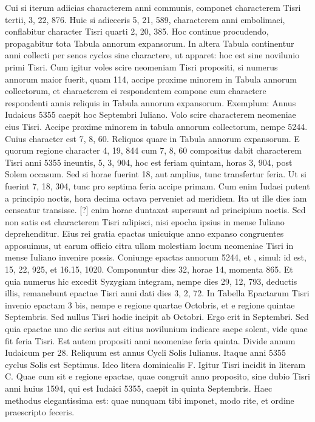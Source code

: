 Cui si iterum adiicias characterem anni communis, componet
characterem Tisri tertii, 3, 22, 876.
Huic si adieceris 5, 21, 589,
characterem anni embolimaei, conflabitur character Tisri quarti
2, 20, 385.
Hoc continue procudendo, propagabitur tota Tabula
annorum expansorum.
In altera Tabula continentur anni collecti
per senos cyclos sine charactere, ut apparet: hoc est sine novilunio
primi Tisri.
Cum igitur voles scire neomeniam Tisri propositi,
si numerus annorum maior fuerit, quam 114, accipe proxime
minorem in Tabula annorum collectorum, et characterem ei
respondentem compone cum charactere respondenti annis reliquis
in Tabula annorum expansorum.
Exemplum: Annus Iudaicus
5355 caepit hoc Septembri Iuliano.
Volo scire characterem
neomeniae eius Tisri.
Accipe proxime minorem in tabula annorum
collectorum, nempe 5244.
Cuius character est 7, 8, 60.
Reliquos  quare in Tabula annorum expansorum.
E quorum
regione character 4, 19, 844 cum 7, 8, 60 compositus dabit characterem
Tisri anni 5355 ineuntis, 5, 3, 904, hoc est feriam quintam,
horas 3, 904, post Solem occasum.
Sed si horae fuerint 18, aut
amplius, tunc transfertur feria.
Ut si fuerint 7, 18, 304, tunc pro septima
feria accipe primam.
Cum enim Iudaei putent a principio noctis,
hora decima octava perveniet ad meridiem.
Ita ut ille dies
iam censeatur transisse.
[?] enim horae duntaxat supersunt ad principium
noctis.
Sed non satis est characterem Tisri adipisci, nisi epocha
ipsius in mense Iuliano deprehenditur.
Eius rei gratia epactas
unicuique anno expanso congruentes apposuimus, ut earum officio
citra ullam molestiam locum neomeniae Tisri in mense Iuliano
invenire possis.
Coniunge epactas annorum 5244, et , simul: id
est, 15, 22, 925, et 16.15, 1020.
Componuntur dies 32, horae 14,
momenta 865.
Et quia numerus hic excedit Syzygiam integram,
nempe dies 29, 12, 793, deductis illis, remanebunt epactae Tisri
anni dati dies 3, 2, 72.
In Tabella Epactarum Tisri invenio epactam
3 bis, nempe e regione quartae Octobris, et e regione quintae
Septembris.
Sed nullus Tisri hodie incipit ab Octobri.
Ergo
erit in Septembri.
Sed quia epactae uno die serius aut citius novilunium
indicare saepe solent, vide quae fit feria Tisri.
Est autem
propositi anni neomeniae feria quinta.
Divide annum Iudaicum
per 28.
Reliquum est annus Cycli Solis Iulianus.
Itaque anni 5355
cyclus Solis est Septimus.
Ideo litera dominicalis \textsc{F}.
Igitur Tisri incidit
in literam \textsc{C}.
Quae cum sit e regione epactae, quae congruit anno
proposito, sine dubio Tisri anni huius 1594, qui est Iudaici 5355,
caepit in quinta Septembris.
Haec methodus elegantissima est: quae
nunquam tibi imponet, modo rite, et ordine praescripto feceris.

